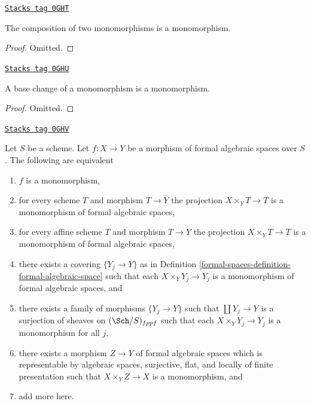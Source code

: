 \begin{lemma}
\label{formal-spaces-lemma-composition-monomorphism}
\href{https://stacks.math.columbia.edu/tag/0GHT}{\texttt{Stacks tag 0GHT}}

The composition of two monomorphisms is a monomorphism.
\end{lemma}

\begin{proof}
Omitted.
\end{proof}

\begin{lemma}
\label{formal-spaces-lemma-base-change-monomorphism}
\href{https://stacks.math.columbia.edu/tag/0GHU}{\texttt{Stacks tag 0GHU}}

A base change of a monomorphism is a monomorphism.
\end{lemma}

\begin{proof}
Omitted.
\end{proof}

\begin{lemma}
\label{formal-spaces-lemma-characterize-monomorphisms}
\href{https://stacks.math.columbia.edu/tag/0GHV}{\texttt{Stacks tag 0GHV}}

Let $S$ be a scheme. Let $f : X \to Y$ be a morphism of formal algebraic
spaces over $S$. The following are equivalent
\begin{enumerate}
\item $f$ is a monomorphism,
\item for every scheme $T$ and morphism $T \to Y$
the projection $X \times_Y T \to T$ is a monomorphism
of formal algebraic spaces,
\item for every affine scheme $T$ and morphism $T \to Y$
the projection $X \times_Y T \to T$ is a monomorphism of formal
algebraic spaces,
\item there exists a covering $\{Y_j \to Y\}$ as in
Definition \ref{formal-spaces-definition-formal-algebraic-space}
such that each $X \times_Y Y_j \to Y_j$ is a monomorphism of
formal algebraic spaces, and
\item there exists a family of morphisms $\{Y_j \to Y\}$ such
that $\coprod Y_j \to Y$ is a surjection of sheaves on
$(\Sch/S)_{fppf}$ such that each $X \times_Y Y_j \to Y_j$ is a
monomorphism for all $j$,
\item there exists a morphism $Z \to Y$ of formal algebraic spaces
which is representable by algebraic spaces, surjective, flat, and locally
of finite presentation such that $X \times_Y Z \to X$ is a monomorphism, and
\item add more here.
\end{enumerate}
\end{lemma}

